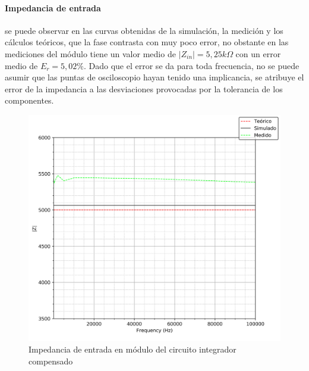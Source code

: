 \paragraph*{Impedancia de entrada} se puede observar en las curvas obtenidas de la simulaci\'on, la medici\'on y los c\'alculos
te\'oricos, que la fase contrasta con muy poco error, no obstante en las mediciones del m\'odulo tiene un valor medio de 
$|Z_{in}| = 5,25k \Omega$ con un error medio de $E_r = 5,02\% $. Dado que el error se da para toda frecuencia, no se puede asumir que las puntas
de osciloscopio hayan tenido una implicancia, se atribuye el error de la impedancia a las desviaciones provocadas por la tolerancia de los componentes.

\begin{figure}[H]
	\centering
	\includegraphics[scale=0.6]{Recursos/Integrador_compensado/impedancia_modulo.png}
	\caption{Impedancia de entrada en m\'odulo del circuito integrador compensado}
	\label{fig:integrador_compensado_impedancia_modulo}
\end{figure}

